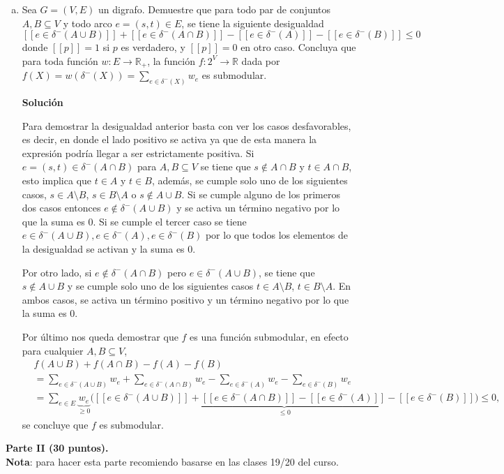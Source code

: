 \documentclass{article}
\newcommand{\IV}[1]{[\![#1]\!]} %
\newcommand{\RR}{\mathbb R}
\theoremstyle{plain}
\theoremstyle{definition}
\theoremstyle{Azul}
\begin{document}
\begin{enumerate}[(a)]
\item Sea $G=(V,E)$ un digrafo. Demuestre que para todo par de conjuntos $A, B\subseteq V$ y todo arco $e=(s,t)\in E$, se tiene la siguiente desigualdad
$$\IV{e\in \delta^-(A\cup B)}+\IV{e\in \delta^-(A\cap B)}-\IV{e\in \delta^-(A)}-\IV{e\in \delta^-(B)} \leq 0$$
donde $\IV{p}=1$ si $p$ es verdadero, y $\IV{p}=0$ en otro caso.
Concluya que para toda función $w\colon E \to \RR_+$, la función $f\colon 2^V\to \RR$ dada por $f(X)=w(\delta^-(X)) = \sum_{e\in \delta^-(X)}w_e$ es submodular.

\textbf{Solución}

Para demostrar la desigualdad anterior basta con ver los casos desfavorables, es decir, en donde el lado positivo se activa ya que de esta manera la expresión podría llegar a ser estrictamente positiva. Si $e=(s,t)\in\delta^{-}(A\cap B)$ para $A, B \subseteq V$ se tiene que $s\notin A\cap B$ y $t\in A\cap B$, esto implica que $t\in A$ y $t\in B$, además,  se cumple solo uno de los siguientes casos, $s\in A\setminus B$, $s\in B\setminus A$ o $s\notin A\cup B$. Si se cumple alguno de los primeros dos casos entonces $e\not\in \delta^{-}(A\cup B)$ y se activa un término negativo por lo que la suma es 0. Si se cumple el tercer caso se tiene $e\in\delta^{-}(A\cup B), e\in\delta^{-}(A), e\in\delta^{-}(B)$ por lo que todos los elementos de la desigualdad se activan y la suma es 0.

Por otro lado, si $e\notin \delta^{-}(A\cap B)$ pero $e\in\delta^{-}(A\cup B)$, se tiene que $s\notin A\cup B$ y se cumple solo uno de los siguientes casos  $t\in A\setminus B$, $t\in B\setminus A$. En ambos casos, se activa un término positivo y un término negativo por lo que la suma es 0.

Por último nos queda demostrar que $f$ es una función submodular, en efecto para cualquier $A, B \subseteq V$,
\begin{align*}
    & f(A\cup B)+f(A\cap B)-f(A)-f(B)
    \\ 
    &=\sum_{e\in \delta^{-}(A\cup B)}w_{e}+\sum_{e\in \delta^{-}(A\cap B)}w_{e}-\sum_{e\in \delta^{-}(A)}w_{e}-\sum_{e\in \delta^{-}(B)}w_{e}\\
    &= \sum_{e\in E}\underbrace{w_{e}}_{\geq 0}\underbrace{\bigg(\IV{e\in \delta^-(A\cup B)}+\IV{e\in \delta^-(A\cap B)}-\IV{e\in \delta^-(A)}-\IV{e\in \delta^-(B)}\bigg)}_{\leq 0} \leq 0,
\end{align*}
se concluye que $f$ es submodular.
\end{enumerate}

\noindent \textbf{Parte II (30 puntos).} \\
\textbf{Nota}: para hacer esta parte recomiendo basarse en las clases 19/20 del curso.\\
\end{document}
